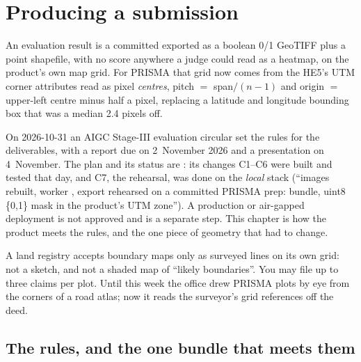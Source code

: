 \chapter{Producing a submission}\label{ch:submission}

\begin{onething}
An evaluation result is a committed  exported as a boolean 0/1 GeoTIFF plus a point
shapefile, with no score anywhere a judge could read as a heatmap, on the product's own map grid. For PRISMA that grid
now comes from the HE5's UTM corner attributes read as pixel \emph{centres}, pitch $=$ span$/(n-1)$ and origin $=$
upper-left centre minus half a pixel, replacing a latitude and longitude bounding box that was a median 2.4 pixels
off.
\end{onething}

On 2026-10-31 an AIGC Stage-III evaluation circular set the rules for the deliverables, with a report due on
2~November 2026 and a presentation on 4~November. The plan and its status are
: its changes C1--C6 were built and tested that day, and C7, the
rehearsal, was done on the \emph{local} stack (``images rebuilt, worker , export rehearsed on a committed
PRISMA prep:  bundle, uint8 \{0,1\} mask in the product's UTM zone''). A production or air-gapped
deployment is not approved and is a separate step. This chapter is how the product meets the rules, and the one piece
of geometry that had to change.

\begin{analogy}
A land registry accepts boundary maps only as surveyed lines on its own grid: not a sketch, and not a shaded map of
``likely boundaries''. You may file up to three claims per plot. Until this week the office drew PRISMA plots by eye
from the corners of a road atlas; now it reads the surveyor's grid references off the deed.
\end{analogy}

\section{The rules, and the one bundle that meets them}\label{sec:submission:rules}

